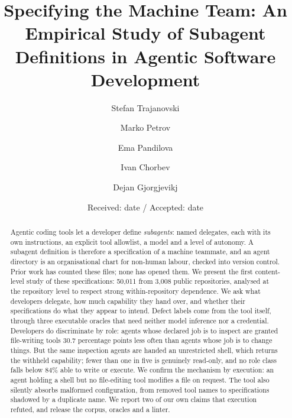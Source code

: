 \documentclass[smallextended,natbib]{svjour3}
\begin{document}
\title{Specifying the Machine Team: An Empirical Study of Subagent Definitions in Agentic
Software Development}

\author{Stefan Trajanovski \and Marko Petrov \and Ema Pandilova \and Ivan Chorbev \and
Dejan Gjorgjevikj}


\date{Received: date / Accepted: date}

\maketitle

\begin{abstract}
Agentic coding tools let a developer define \emph{subagents}: named delegates, each
with its own instructions, an explicit tool allowlist, a model and a level of autonomy. A subagent
definition is therefore a specification of a machine teammate, and an agent directory is an
organisational chart for non-human labour, checked into version control. Prior work has counted
these files; none has opened them. We present the first content-level study of these
specifications: 50,011 from 3,008 public repositories, analysed at the repository level to respect
strong within-repository dependence. We ask what developers delegate, how much capability they hand
over, and whether their specifications do what they appear to intend. Defect labels come from the
tool itself, through three executable oracles that need neither model inference nor a credential.
Developers do discriminate by role: agents whose declared job is to inspect are granted
file-writing tools 30.7 percentage points less often than agents whose job is to change things.
But the same inspection agents are handed an unrestricted shell, which returns the withheld
capability; fewer than one in five is genuinely read-only, and no role class falls below 84\% able
to write or execute. We confirm the mechanism by execution: an agent holding a shell but no
file-editing tool modifies a file on request. The tool also silently absorbs malformed
configuration, from removed tool names to specifications shadowed by a duplicate name. We report
two of our own claims that execution refuted, and release the corpus, oracles and a linter.
\end{abstract}
\end{document}

